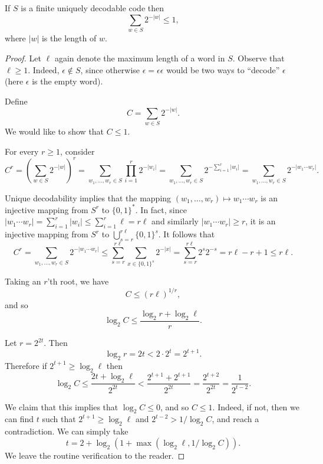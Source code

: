 
\begin{theorem}
If $S$ is a finite uniquely decodable code then
\[
 \sum_{w \in S} 2^{-|w|} \leq 1,
\]
where $|w|$ is the length of $w$.
\end{theorem}
\begin{proof}
Let $\ell$ again denote the maximum length of a word in $S$. Observe that $\ell \geq 1$. Indeed, $\epsilon \notin S$, since otherwise $\epsilon = \epsilon\epsilon$ would be two ways to ``decode'' $\epsilon$ (here $\epsilon$ is the empty word).

Define
\[
 C = \sum_{w \in S} 2^{-|w|}.
\]
We would like to show that $C \leq 1$.

For every $r \geq 1$, consider
\[
 C^r =
 \left(\sum_{w \in S} 2^{-|w|}\right)^r =
 \sum_{w_1,\dots,w_r \in S} \prod_{i=1}^r 2^{-|w_i|} =
 \sum_{w_1,\dots,w_r \in S} 2^{-\sum_{i=1}^r |w_i|} =
 \sum_{w_1,\dots,w_r \in S} 2^{-|w_1 \cdots w_r|}.
\]

Unique decodability implies that the mapping $(w_1,\dots,w_r) \mapsto w_1 \cdots w_r$ is an injective mapping from $S^r$ to $\{0,1\}^*$. In fact, since $|w_1 \cdots w_r| = \sum_{i=1}^r |w_i| \leq \sum_{i=1}^r \ell = r\ell$ and similarly $|w_1 \cdots w_r| \geq r$, it is an injective mapping from $S^r$ to $\bigcup_{s=r}^{r\ell} \{0,1\}^s$. It follows that
\[
 C^r = \sum_{w_1,\dots,w_r \in S} 2^{-|w_1 \cdots w_r|} \leq
 \sum_{s=r}^{r\ell} \sum_{x \in \{0,1\}^s} 2^{-|x|} =
 \sum_{s=r}^{r\ell} 2^s 2^{-s} = r\ell - r + 1 \leq r\ell.
\]

Taking an $r$'th root, we have
\[
 C \leq (r\ell)^{1/r},
\]
and so
\[
 \log_2 C \leq \frac{\log_2 r + \log_2 \ell}{r}.
\]

Let $r = 2^{2t}$. Then
\[
 \log_2 r = 2t < 2 \cdot 2^t = 2^{t+1}.
\]
Therefore if $2^{t+1} \geq \log_2 \ell$ then
\[
 \log_2 C \leq \frac{2t + \log_2 \ell}{2^{2t}} <
 \frac{2^{t+1} + 2^{t+1}}{2^{2t}} = \frac{2^{t+2}}{2^{2t}} = \frac{1}{2^{t-2}}.
\]

We claim that this implies that $\log_2 C \leq 0$, and so $C \leq 1$. Indeed, if not, then we can find $t$ such that $2^{t+1} \geq \log_2 \ell$ and $2^{t-2} > 1/\log_2 C$, and reach a contradiction. We can simply take
\[
 t = 2 + \log_2 (1 + \max(\log_2 \ell, 1/\log_2 C)).
\]
We leave the routine verification to the reader.
\end{proof}

